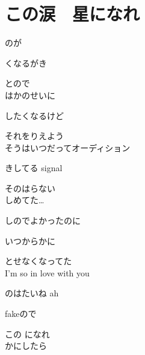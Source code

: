 \section{ この涙　星になれ}


\large{

のが

くなるがき

とので
\\

はかのせいに

したくなるけど

それをりえよう
\\

そうはいつだってオーディション

きしてる signal

そのはらない
\\

しめてた…

しのでよかったのに

いつからかに

とせなくなってた
\\

I'm so in love with you

のはたいね ah

fakeので

この になれ
\\

かにしたら

}
